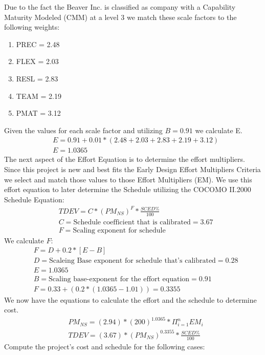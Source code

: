 \documentclass[12pt,letterpaper]{article}
\begin{document}
Due to the fact the Beaver Inc. is classified as company with a Capability Maturity Modeled (CMM) at a level 3 we match these scale factors to the following weights:
    \begin{enumerate}
        \item PREC = 2.48
        \item FLEX = 2.03
        \item RESL = 2.83
        \item TEAM = 2.19
        \item PMAT = 3.12
    \end{enumerate}
Given the values for each scale factor and utilizing $B = 0.91$ we calculate E.
    \begin{align*}
        &E = 0.91 + 0.01 * (2.48+2.03+2.83+2.19+3.12)\\
        &E = 1.0365
    \end{align*}
The next aspect of the Effort Equation is to determine the effort multipliers. Since this project is new and best fits the Early Design Effort Multipliers Criteria we select and match those values to those Effort Multipliers (EM).
We use this effort equation to later determine the Schedule utilizing the COCOMO II.2000 Schedule Equation:
    \begin{align*}
        &TDEV = C * (PM_{NS})^F * \frac{SCED\%}{100}\\
        &C = \text{Schedule coefficient that is calibrated} = 3.67\\
        &F = \text{Scaling exponent for schedule}
    \end{align*}
We calculate $F$:
    \begin{align*}
        &F = D + 0.2*[E-B]\\
        &D = \text{Scaleing Base exponent for schedule that's calibrated}=0.28\\
        &E = 1.0365\\
        &B = \text{Scaling base-exponent for the effort equation} = 0.91\\
        &F= 0.33+(0.2*(1.0365 - 1.01)) = 0.3355
    \end{align*}
We now have the equations to calculate the effort and the schedule to determine cost.
    \begin{align*}
        &PM_{NS} = (2.94)*(200)^{1.0365} * \Pi_{i=1}^{n}EM_i\\
        &TDEV = (3.67)*(PM_{NS})^{0.3355}* \frac{SCED\%}{100}
    \end{align*}
Compute the project’s cost and schedule for the following cases:
\end{document}

